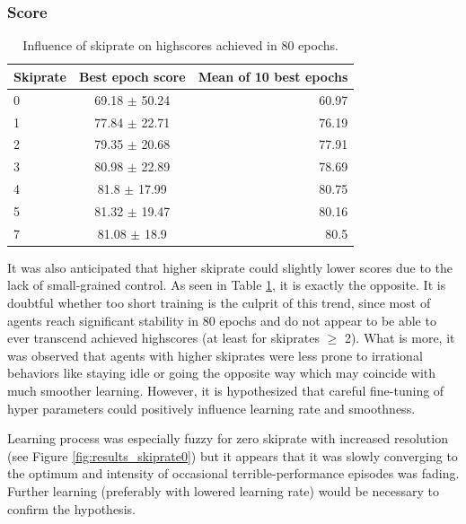 \documentclass[english,bachelor,a4paper,twoside]{ppfcmthesis}
\begin{document}
		\subsubsection*{Score}
			\begin{table}
				\begin{center}
					\begin{tabular}{ |l || c | r |}
						\hline
						Skiprate & Best epoch score & Mean of 10 best epochs \\ \hline
						0 & 69.18 $\pm$ 50.24 & 60.97 \\ \hline
						1 & 77.84 $\pm$ 22.71 & 76.19 \\ \hline
						2 & 79.35 $\pm$ 20.68 & 77.91 \\ \hline
						3 & 80.98 $\pm$ 22.89 & 78.69 \\ \hline
						4 & 81.8 $\pm$ 17.99 & 80.75 \\ \hline
						5 & 81.32 $\pm$ 19.47 & 80.16 \\ \hline
						7 & 81.08 $\pm$ 18.9 & 80.5 \\ \hline
					\end{tabular}
				\end{center}
				\caption{Influence of skiprate on highscores achieved in 80 epochs.}\label{tab:results}
			\end{table}
			It was also anticipated that higher skiprate could slightly lower scores due to the lack of small-grained control. As seen in Table \ref{tab:results}, it is exactly the opposite. It is doubtful whether too short training is the culprit of this trend, since most of agents reach significant stability in 80 epochs and do not appear to be able to ever transcend achieved highscores (at least for skiprates $\geq$ 2). What is more, it was observed that agents with higher skiprates were less prone to irrational behaviors like staying idle or going the opposite way which may coincide with much smoother learning. However, it is hypothesized that careful fine-tuning of hyper parameters could positively influence learning rate and smoothness. 

			Learning process was especially fuzzy for zero skiprate with increased resolution (see Figure \ref{fig:results_skiprate0}) but it appears that it was slowly converging to the optimum and intensity of occasional terrible-performance episodes was fading. Further learning (preferably with lowered learning rate) would be necessary to confirm the hypothesis.
	
\end{document}
